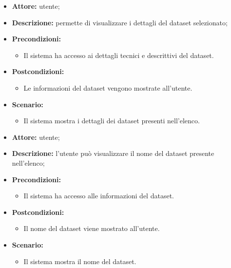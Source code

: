     \begin{itemize}
        \item \textbf{Attore:} utente;
        \item \textbf{Descrizione:} permette di visualizzare i dettagli del dataset selezionato;
        \item \textbf{Precondizioni:}
        \begin{itemize}
            \item Il sistema ha accesso ai dettagli tecnici e descrittivi del dataset.
        \end{itemize}
        \item \textbf{Postcondizioni:}
        \begin{itemize}
            \item Le informazioni del dataset vengono mostrate all'utente.
        \end{itemize}
        \item \textbf{Scenario:}
        \begin{itemize}
            \item Il sistema mostra i dettagli dei dataset presenti nell'elenco.
        \end{itemize}
    \end{itemize}

    \begin{itemize}
        \item \textbf{Attore:} utente;
        \item \textbf{Descrizione:} l'utente può visualizzare il nome del dataset presente nell'elenco;
        \item \textbf{Precondizioni:}
        \begin{itemize}
            \item Il sistema ha accesso alle informazioni del dataset.
        \end{itemize}
        \item \textbf{Postcondizioni:}
        \begin{itemize}
            \item Il nome del dataset viene mostrato all'utente.
        \end{itemize}
        \item \textbf{Scenario:}
        \begin{itemize}
            \item Il sistema mostra il nome del dataset.
        \end{itemize}
    \end{itemize}


